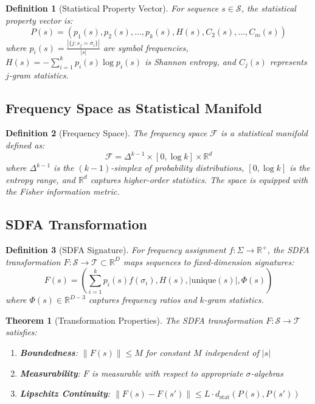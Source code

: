 \documentclass[10pt,journal,compsoc]{IEEEtran}
\newtheorem{definition}{Definition}
\newtheorem{theorem}{Theorem}
\newcommand{\sdfa}{\textsc{SDFA}}
\newcommand{\seqspace}{\mathcal{S}}
\newcommand{\freqspace}{\mathcal{F}}
\newcommand{\sigspace}{\mathcal{T}}
\newcommand{\alphabet}{\Sigma}
\newcommand{\entropy}[1]{H(#1)}
\newcommand{\prob}[1]{P(#1)}
\newcommand{\real}{\mathbb{R}}
\begin{document}
\begin{definition}[Statistical Property Vector]
For sequence $s \in \seqspace$, the statistical property vector is:
\[\prob{s} = (p_1(s), p_2(s), \ldots, p_k(s), \entropy{s}, C_2(s), \ldots, C_m(s))\]
where $p_i(s) = \frac{|\{j : s_j = \sigma_i\}|}{|s|}$ are symbol frequencies, $\entropy{s} = -\sum_{i=1}^k p_i(s) \log p_i(s)$ is Shannon entropy, and $C_j(s)$ represents $j$-gram statistics.
\end{definition}

\subsection{Frequency Space as Statistical Manifold}

\begin{definition}[Frequency Space]
The frequency space $\freqspace$ is a statistical manifold defined as:
\[\freqspace = \Delta^{k-1} \times [0, \log k] \times \real^{d}\]
where $\Delta^{k-1}$ is the $(k-1)$-simplex of probability distributions, $[0, \log k]$ is the entropy range, and $\real^d$ captures higher-order statistics. The space is equipped with the Fisher information metric.
\end{definition}

\subsection{SDFA Transformation}

\begin{definition}[\sdfa{} Signature]
For frequency assignment $f: \alphabet \to \real^+$, the \sdfa{} transformation $F: \seqspace \to \sigspace \subset \real^D$ maps sequences to fixed-dimension signatures:
\[F(s) = \left( \sum_{i=1}^k p_i(s) f(\sigma_i), \entropy{s}, |\text{unique}(s)|, \Phi(s) \right)\]
where $\Phi(s) \in \real^{D-3}$ captures frequency ratios and $k$-gram statistics.
\end{definition}

\begin{theorem}[Transformation Properties]
The \sdfa{} transformation $F: \seqspace \to \sigspace$ satisfies:
\begin{enumerate}
    \item \textbf{Boundedness}: $\|F(s)\| \leq M$ for constant $M$ independent of $|s|$
    \item \textbf{Measurability}: $F$ is measurable with respect to appropriate $\sigma$-algebras
    \item \textbf{Lipschitz Continuity}: $\|F(s) - F(s')\| \leq L \cdot d_{\text{stat}}(\prob{s}, \prob{s'})$
\end{enumerate}
\end{theorem}
\end{document}
